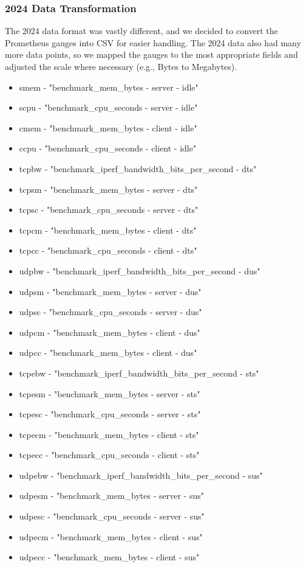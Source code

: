 \subsubsection{2024 Data Transformation}

The 2024 data format was vastly different, and we decided to convert the Prometheus gauges into CSV for easier handling. The 2024 data also had many more data points, so we mapped the gauges to the most appropriate fields and adjusted the scale where necessary (e.g., Bytes to Megabytes).

\begin{itemize}
    \item smem - "benchmark\_mem\_bytes - server - idle"
    \item scpu - "benchmark\_cpu\_seconds - server - idle"
    \item cmem - "benchmark\_mem\_bytes - client - idle"
    \item ccpu - "benchmark\_cpu\_seconds - client - idle"
    \item tcpbw - "benchmark\_iperf\_bandwidth\_bits\_per\_second - dts"
    \item tcpsm - "benchmark\_mem\_bytes - server - dts"
    \item tcpsc - "benchmark\_cpu\_seconds - server - dts"
    \item tcpcm - "benchmark\_mem\_bytes - client - dts"
    \item tcpcc - "benchmark\_cpu\_seconds - client - dts"
    \item udpbw - "benchmark\_iperf\_bandwidth\_bits\_per\_second - dus"
    \item udpsm - "benchmark\_mem\_bytes - server - dus"
    \item udpsc - "benchmark\_cpu\_seconds - server - dus"
    \item udpcm - "benchmark\_mem\_bytes - client - dus"
    \item udpcc - "benchmark\_mem\_bytes - client - dus"
    \item tcpebw - "benchmark\_iperf\_bandwidth\_bits\_per\_second - sts"
    \item tcpesm - "benchmark\_mem\_bytes - server - sts"
    \item tcpesc - "benchmark\_cpu\_seconds - server - sts"
    \item tcpecm - "benchmark\_mem\_bytes - client - sts"
    \item tcpecc - "benchmark\_cpu\_seconds - client - sts"
    \item udpebw - "benchmark\_iperf\_bandwidth\_bits\_per\_second - sus"
    \item udpesm - "benchmark\_mem\_bytes - server - sus"
    \item udpesc - "benchmark\_cpu\_seconds - server - sus"
    \item udpecm - "benchmark\_mem\_bytes - client - sus"
    \item udpecc - "benchmark\_mem\_bytes - client - sus"
\end{itemize}

